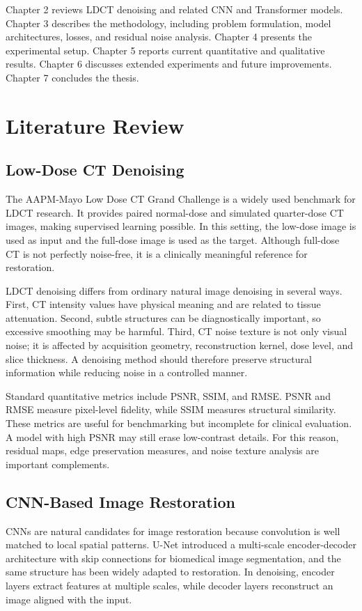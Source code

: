 \documentclass[12pt,a4paper]{report}
\begin{document}
Chapter 2 reviews LDCT denoising and related CNN and Transformer models. Chapter 3 describes the methodology, including problem formulation, model architectures, losses, and residual noise analysis. Chapter 4 presents the experimental setup. Chapter 5 reports current quantitative and qualitative results. Chapter 6 discusses extended experiments and future improvements. Chapter 7 concludes the thesis.

\chapter{Literature Review}

\section{Low-Dose CT Denoising}

The AAPM-Mayo Low Dose CT Grand Challenge is a widely used benchmark for LDCT research. It provides paired normal-dose and simulated quarter-dose CT images, making supervised learning possible. In this setting, the low-dose image is used as input and the full-dose image is used as the target. Although full-dose CT is not perfectly noise-free, it is a clinically meaningful reference for restoration.

LDCT denoising differs from ordinary natural image denoising in several ways. First, CT intensity values have physical meaning and are related to tissue attenuation. Second, subtle structures can be diagnostically important, so excessive smoothing may be harmful. Third, CT noise texture is not only visual noise; it is affected by acquisition geometry, reconstruction kernel, dose level, and slice thickness. A denoising method should therefore preserve structural information while reducing noise in a controlled manner.

Standard quantitative metrics include PSNR, SSIM, and RMSE. PSNR and RMSE measure pixel-level fidelity, while SSIM measures structural similarity. These metrics are useful for benchmarking but incomplete for clinical evaluation. A model with high PSNR may still erase low-contrast details. For this reason, residual maps, edge preservation measures, and noise texture analysis are important complements.

\section{CNN-Based Image Restoration}

CNNs are natural candidates for image restoration because convolution is well matched to local spatial patterns. U-Net introduced a multi-scale encoder-decoder architecture with skip connections for biomedical image segmentation, and the same structure has been widely adapted to restoration. In denoising, encoder layers extract features at multiple scales, while decoder layers reconstruct an image aligned with the input.
\end{document}
